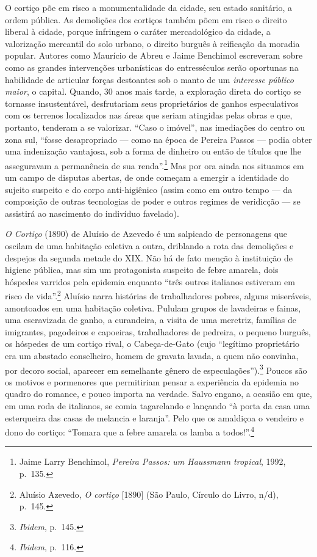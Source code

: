 O cortiço põe em risco a monumentalidade da cidade, seu estado
sanitário, a ordem pública. As demolições dos cortiços também põem em
risco o direito liberal à cidade, porque infringem o caráter
mercadológico da cidade, a valorização mercantil do solo urbano, o
direito burguês à reificação da moradia popular. Autores como Maurício
de Abreu e Jaime Benchimol escreveram sobre como as grandes intervenções
urbanísticas do entresséculos serão oportunas na habilidade de articular
forças destoantes sob o manto de um \textit{interesse público maior}, o
capital. Quando, 30 anos mais tarde, a exploração direta do cortiço se
tornasse insustentável, desfrutariam seus proprietários de ganhos
especulativos com os terrenos localizados nas áreas que seriam atingidas
pelas obras e que, portanto, tenderam a se valorizar. ``Caso o imóvel'',
nas imediações do centro ou zona sul, ``fosse desapropriado --- como na
época de Pereira Passos --- podia obter uma indenização vantajosa, sob a
forma de dinheiro ou então de títulos que lhe asseguravam a permanência
de sua renda''.\footnote{Jaime Larry Benchimol, \textit{Pereira Passos: um
  Haussmann tropical}, 1992, p.~135.} Mas por ora ainda nos situamos em
um campo de disputas abertas, de onde começam a emergir a identidade do
sujeito suspeito e do corpo anti-higiênico (assim como em outro tempo ---
da composição de outras tecnologias de poder e outros regimes de
veridicção --- se assistirá ao nascimento do indivíduo favelado).

\textit{O Cortiço} (1890) de Aluísio de Azevedo é um salpicado de
personagens que oscilam de uma habitação coletiva a outra, driblando a
rota das demolições e despejos da segunda metade do XIX. Não há de fato
menção à instituição de higiene pública, mas sim um protagonista
suspeito de febre amarela, dois hóspedes varridos pela epidemia enquanto
``três outros italianos estiveram em risco de vida''.\footnote{Aluísio
  Azevedo, \textit{O cortiço} {[}1890{]} (São Paulo, Círculo do Livro,
  n/d), p.~145.} Aluísio narra histórias de trabalhadores pobres, alguns
miseráveis, amontoados em uma habitação coletiva. Pululam grupos de
lavadeiras e fainas, uma escravizada de ganho, a curandeira, a visita de
uma meretriz, famílias de imigrantes, pagodeiros e capoeiras,
trabalhadores de pedreira, o pequeno burguês, os hóspedes de um cortiço
rival, o Cabeça-de-Gato (cujo ``legítimo proprietário era um abastado
conselheiro, homem de gravata lavada, a quem não convinha, por decoro
social, aparecer em semelhante gênero de especulações'').\footnote{\textit{Ibidem},
  p.~145.} Poucos são os motivos e pormenores que permitiriam pensar a
experiência da epidemia no quadro do romance, e pouco importa na
verdade. Salvo engano, a ocasião em que, em uma roda de italianos, se
comia tagarelando e lançando ``à porta da casa uma esterqueira das casas
de melancia e laranja''. Pelo que os amaldiçoa o vendeiro e dono do
cortiço: ``Tomara que a febre amarela os lamba a todos!''.\footnote{\textit{Ibidem},
  p.~116.}


